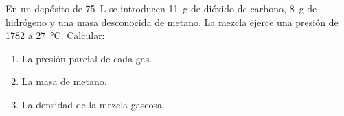 En un depósito de \SI{75}{\liter} se introducen \SI{11}{\gram} de dióxido de carbono, \SI{8}{\gram} de hidrógeno y una masa desconocida de metano. La mezcla ejerce una presión de \SI{1782}{\torr} a \SI{27}{\celsius}. Calcular:
\begin{enumerate}[label={\alph*)},font={\color{red!50!black}\bfseries}]
    \item La presión parcial de cada gas.
    \item La masa de metano.
    \item La densidad de la mezcla gaseosa.
\end{enumerate}
